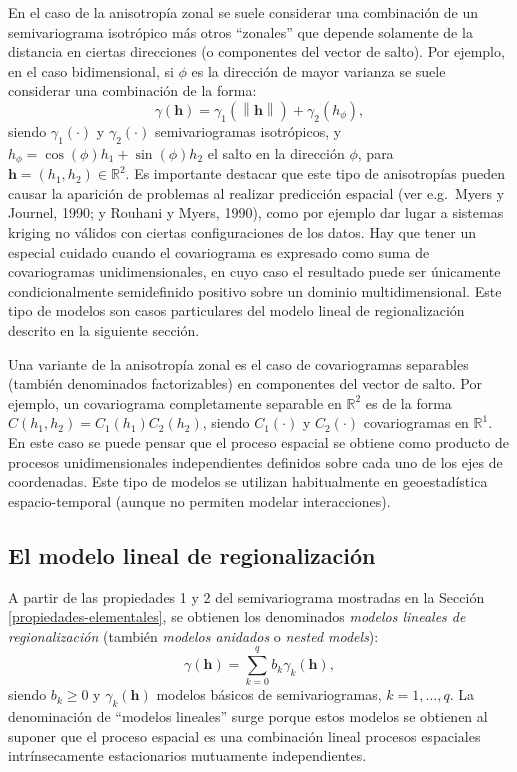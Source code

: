 \documentclass[
  spanish,
]{book}
\theoremstyle{break}
\theoremstyle{definition}
\theoremstyle{definition}
\theoremstyle{definition}
\theoremstyle{definition}
\theoremstyle{remark}
\begin{document}
En el caso de la anisotropía zonal se suele considerar una combinación de un semivariograma isotrópico más otros ``zonales'' que depende solamente de la distancia en ciertas direcciones (o componentes del vector de salto).
Por ejemplo, en el caso bidimensional, si \(\phi\) es la dirección de mayor varianza se suele considerar una combinación de la forma:
\[\gamma(\mathbf{h})=\gamma_1 (\left\| \mathbf{h}\right\|)+\gamma_2(h_{\phi }),\]
siendo \(\gamma_1 (\cdot)\) y \(\gamma_2 (\cdot)\) semivariogramas isotrópicos, y \(h_{\phi } =\cos (\phi)h_1 +\sin(\phi)h_2\) el salto en la dirección \(\phi\), para \(\mathbf{h}=(h_1 ,h_2)\in \mathbb{R} ^{2}\).
Es importante destacar que este tipo de anisotropías pueden causar la aparición de problemas al realizar predicción espacial (ver e.g.~Myers y Journel, 1990; y Rouhani y Myers, 1990), como por ejemplo dar lugar a sistemas kriging no válidos con ciertas configuraciones de los datos.
Hay que tener un especial cuidado cuando el covariograma es expresado como suma de covariogramas unidimensionales, en cuyo caso el resultado puede ser únicamente condicionalmente semidefinido positivo sobre un dominio multidimensional.
Este tipo de modelos son casos particulares del modelo lineal de regionalización descrito en la siguiente sección.

Una variante de la anisotropía zonal es el caso de covariogramas separables (también denominados factorizables) en componentes del vector de salto.
Por ejemplo, un covariograma completamente separable en \(\mathbb{R}^2\) es de la forma \(C(h_1, h_2)= C_1(h_1)C_2(h_2)\), siendo \(C_1(\cdot)\) y \(C_2(\cdot)\) covariogramas en \(\mathbb{R}^{1}\).
En este caso se puede pensar que el proceso espacial se obtiene como producto de procesos unidimensionales independientes definidos sobre cada uno de los ejes de coordenadas.
Este tipo de modelos se utilizan habitualmente en geoestadística espacio-temporal (aunque no permiten modelar interacciones).

\hypertarget{vario-lin-reg}{%
\subsection{El modelo lineal de regionalización}\label{vario-lin-reg}}

A partir de las propiedades 1 y 2 del semivariograma mostradas en la Sección \ref{propiedades-elementales}, se obtienen los denominados \emph{modelos lineales de regionalización} (también \emph{modelos anidados} o \emph{nested models}):
\[\gamma(\mathbf{h}) = \sum\limits_{k=0}^{q}b_{k} \gamma_{k}(\mathbf{h}),\]
siendo \(b_k \ge 0\) y \(\gamma_{k}(\mathbf{h})\) modelos básicos de semivariogramas, \(k=1, \ldots, q\).
La denominación de ``modelos lineales'' surge porque estos modelos se obtienen al suponer que el proceso espacial es una combinación lineal procesos espaciales intrínsecamente estacionarios mutuamente independientes.
\end{document}
